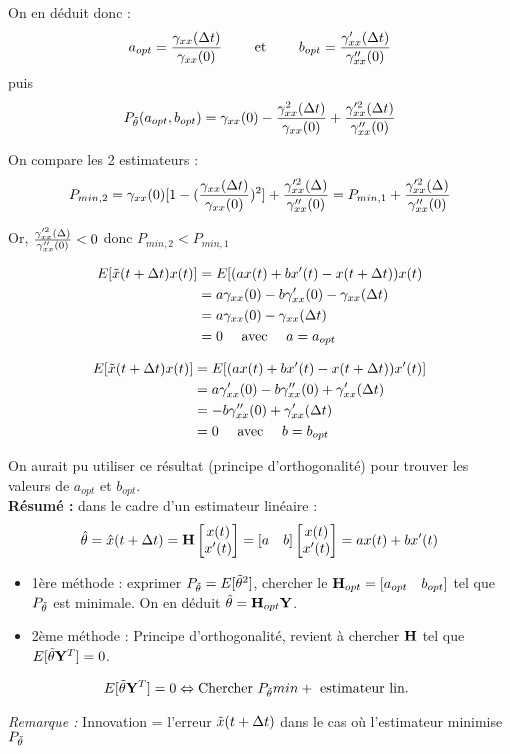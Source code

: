 \documentclass[main.tex]{subfiles}
\begin{document}
\begin{enumerate}
On en déduit donc :
\[ a_{opt} = \frac{\gamma_{xx}(\Delta t)}{\gamma_{xx}(0)} \quad \quad\text{ et }\quad \quad b_{opt} = \frac{\gamma_{xx}'(\Delta t)}{\gamma_{xx}''(0)} \]
puis
\[P_{\tilde{\theta}}(a_{opt},b_{opt}) = \gamma_{xx}(0) - \frac{\gamma_{xx}^2(\Delta t)}{\gamma_{xx}(0)} + \frac{\gamma_{xx}'^2(\Delta t)}{\gamma_{xx}''(0)} \]

On compare les 2 estimateurs :
\[P_{min,2} = \gamma_{xx}(0)[1 -(\frac{\gamma_{xx}(\Delta t)}{\gamma_{xx}(0)})^2] + \frac{\gamma_{xx}'^2(\Delta)}{\gamma_{xx}''(0)} = P_{min,1} + \frac{\gamma_{xx}'^2(\Delta)}{\gamma_{xx}''(0)} \]

Or, $\frac{\gamma_{xx}'^2(\Delta)}{\gamma_{xx}''(0)}<0$ donc $P_{min,2} < P_{min,1}$

\begin{align*}
E[\tilde{x}(t+\Delta t)x(t)] & = E[(ax(t)+bx'(t)-x(t+\Delta t))x(t) \\
& = a\gamma_{xx}(0) - b\gamma_{xx}'(0)  - \gamma_{xx}(\Delta t) \\
& = a\gamma_{xx}(0) - \gamma_{xx}(\Delta t) \\
& = 0 \quad\text{ avec }\quad a=a_{opt}
\end{align*}

\begin{align*}
E[\tilde{x}(t+\Delta t)x(t)] & = E[(ax(t)+bx'(t)-x(t+\Delta t))x'(t)] \\
& = a\gamma_{xx}'(0) - b\gamma_{xx}''(0) +\gamma_{xx}'(\Delta t) \\
& = - b\gamma_{xx}''(0) +\gamma_{xx}'(\Delta t) \\
& =0 \quad\text{ avec }\quad b = b_{opt}
\end{align*}

On aurait pu utiliser ce résultat (principe d'orthogonalité) pour trouver les valeurs de $a_{opt}$ et $b_{opt}$.\\

\textbf{Résumé : } dans le cadre d'un estimateur linéaire :  \[\hat{\theta} = \hat{x} (t+\Delta t) = \mathbf{H} \begin{bmatrix} x(t) \\ x'(t)  \end{bmatrix} = [a \quad b]\begin{bmatrix}  x(t) \\ x'(t) \end{bmatrix} =ax(t) + bx'(t)\]
\begin{itemize}
\item 1ère méthode : exprimer $P_{\tilde{\theta}}=E[\tilde{\theta}^2]$, chercher le $\mathbf{H}_{opt} = [a_{opt} \quad b_{opt}]$ tel que $P_{\tilde{\theta}}$ est minimale. On en déduit $\hat{\theta}=\mathbf{H}_{opt} \mathbf{Y}$.
\item 2ème méthode : Principe d'orthogonalité, revient à chercher $\mathbf{H}$ tel que $E[\tilde{\theta}\mathbf{Y}^T]=0$.
\end{itemize}

\[E[\tilde{\theta}\mathbf{Y}^T]=0 \Leftrightarrow \text{Chercher } P_{\tilde{\theta}} min + \text{ estimateur lin. } \]

\textit{Remarque :} Innovation = l'erreur $\tilde{x}(t+\Delta t)$ dans le cas où l'estimateur minimise $P_{\tilde{\theta}}$
\end{enumerate}
\end{document}
